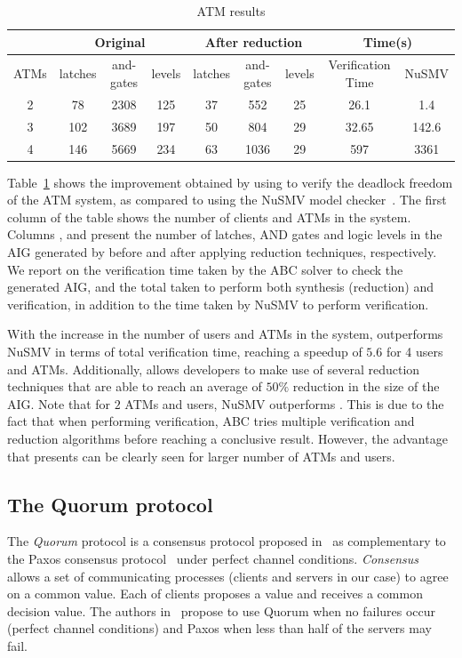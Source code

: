 \begin{table}[tb]
\caption{ATM results}
\centering
\begin{tabular}{|c|c|c|c||c|c|c||c|c|}
\cline {2-9}
\multicolumn{1}{c|}{} &  \multicolumn{3}{c||}{Original} & \multicolumn{3}{c||}{After reduction} &  \multicolumn{2}{c|}{Time(s)} \\ \hline
ATMs & latches & and-gates & levels & latches & and-gates & levels & Verification Time & NuSMV \\ \hline
2 & 78 & 2308 & 125 & 37 & 552 & 25 & 26.1 & 1.4\\ \hline
3 & 102 & 3689 & 197 & 50 & 804 & 29 & 32.65 & 142.6 \\ \hline
4 & 146 & 5669 & 234 & 63 & 1036 & 29 &  597 & 3361 \\ \hline
\end{tabular}
\label{tb:bip:atm}
\end{table}

Table~\ref{tb:bip:atm} shows the improvement obtained by using \biptool{}
to verify the deadlock freedom of the ATM system, as compared to using the
NuSMV model checker~\cite{nusmv}.
The first column of the table shows the number of clients and ATMs in the system.
Columns ,  and  present the number 
of latches, AND gates and logic levels in the AIG generated by \biptool{} before
and after applying reduction techniques, respectively.
We report on the verification time taken by the ABC solver to check the 
generated AIG, and the total taken to perform both synthesis (reduction) 
and verification, in addition to the time taken by NuSMV to perform verification.

With the increase in the number of users and ATMs in the system, \biptool{}  
outperforms NuSMV in terms of total verification time, reaching a speedup 
of $5.6$ for 4 users and ATMs. Additionally, \biptool{} allows developers
to make use of several reduction techniques that are able to reach an 
average of $50\%$ reduction in the size of the AIG. Note that for $2$ ATMs 
and users, NuSMV outperforms \biptool{}. This is due to the fact that when 
performing verification, ABC tries multiple verification and reduction 
algorithms before reaching a conclusive result. However, the advantage 
that \biptool{} presents can be clearly seen for larger number of ATMs and 
users. 


\subsection{The Quorum protocol}
The {\em Quorum} protocol is a consensus protocol proposed in~\cite{guerraoui2012speculative}
as complementary to the Paxos consensus protocol~\cite{gafni2003disk} under perfect
channel conditions. {\em Consensus} allows a set of communicating processes
(clients and servers in our case) to agree on a common value. Each of clients proposes
a value and receives a common decision value. The authors in~\cite{guerraoui2012speculative}
propose to use Quorum when no failures occur (perfect channel conditions) and 
Paxos when less than half of the servers may fail. 


